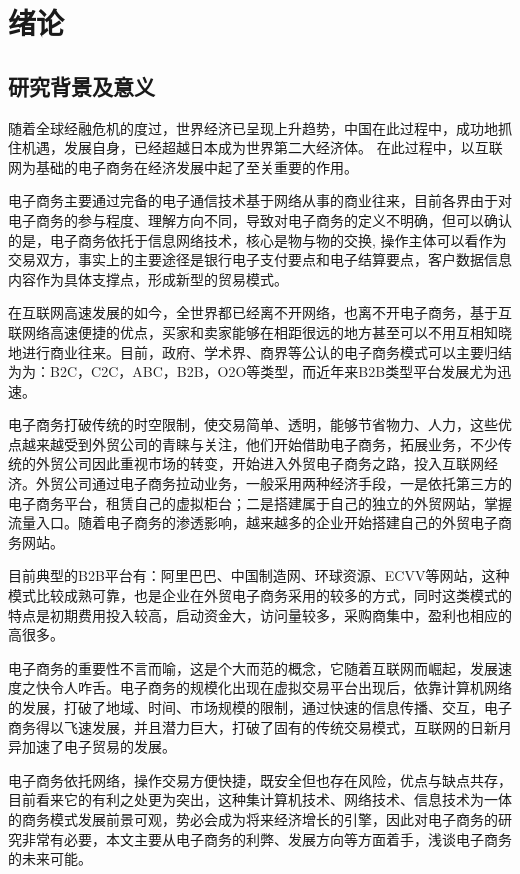 \chapter{绪论}
\section{研究背景及意义}

随着全球经融危机的度过，世界经济已呈现上升趋势，中国在此过程中，成功地抓住机遇，发展自身，已经超越日本成为世界第二大经济体\cite{lvxiaodong2016}。
在此过程中，以互联网为基础的电子商务在经济发展中起了至关重要的作用。

电子商务主要通过完备的电子通信技术基于网络从事的商业往来，目前各界由于对电子商务的参与程度、理解方向不同，导致对电子商务的定义不明确，但可以确认的是，电子商务依托于信息网络技术，核心是物与物的交换,
操作主体可以看作为交易双方，事实上的主要途径是银行电子支付要点和电子结算要点，客户数据信息内容作为具体支撑点，形成新型的贸易模式\cite{wangwen2014}。

在互联网高速发展的如今，全世界都已经离不开网络，也离不开电子商务，基于互联网络高速便捷的优点，买家和卖家能够在相距很远的地方甚至可以不用互相知晓地进行商业往来\cite{xiexiao2015}。目前，政府、学术界、商界等公认的电子商务模式可以主要归结为为：B2C，C2C，ABC，B2B，O2O等类型，而近年来B2B类型平台发展尤为迅速。

电子商务打破传统的时空限制，使交易简单、透明，能够节省物力、人力，这些优点越来越受到外贸公司的青睐与关注，他们开始借助电子商务，拓展业务，不少传统的外贸公司因此重视市场的转变，开始进入外贸电子商务之路，投入互联网经济。外贸公司通过电子商务拉动业务，一般采用两种经济手段，一是依托第三方的电子商务平台，租赁自己的虚拟柜台；二是搭建属于自己的独立的外贸网站，掌握流量入口\cite{zhangjianhui2009}。随着电子商务的渗透影响，越来越多的企业开始搭建自己的外贸电子商务网站。

目前典型的B2B平台有：阿里巴巴、中国制造网、环球资源、ECVV等网站，这种模式比较成熟可靠，也是企业在外贸电子商务采用的较多的方式，同时这类模式的特点是初期费用投入较高，启动资金大，访问量较多，采购商集中，盈利也相应的高很多。

电子商务的重要性不言而喻，这是个大而范的概念，它随着互联网而崛起，发展速度之快令人咋舌。电子商务的规模化出现在虚拟交易平台出现后，依靠计算机网络的发展，打破了地域、时间、市场规模的限制，通过快速的信息传播、交互，电子商务得以飞速发展，并且潜力巨大，打破了固有的传统交易模式，互联网的日新月异加速了电子贸易的发展。

电子商务依托网络，操作交易方便快捷，既安全但也存在风险，优点与缺点共存，目前看来它的有利之处更为突出，这种集计算机技术、网络技术、信息技术为一体的商务模式发展前景可观，势必会成为将来经济增长的引擎，因此对电子商务的研究非常有必要，本文主要从电子商务的利弊、发展方向等方面着手，浅谈电子商务的未来可能\cite{zhenhao2012}。

